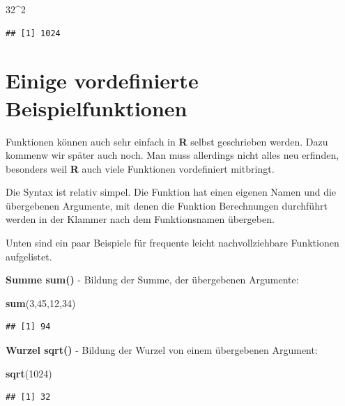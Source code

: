 \documentclass[]{book}
\newenvironment{Shaded}{\begin{snugshade}}{\end{snugshade}}
\newcommand{\KeywordTok}[1]{\textcolor[rgb]{0.13,0.29,0.53}{\textbf{#1}}}
\newcommand{\DecValTok}[1]{\textcolor[rgb]{0.00,0.00,0.81}{#1}}
\newcommand{\OperatorTok}[1]{\textcolor[rgb]{0.81,0.36,0.00}{\textbf{#1}}}
\newcommand{\NormalTok}[1]{#1}
\begin{document}
\begin{Shaded}
\begin{Highlighting}[]
\DecValTok{32}\OperatorTok{^}\DecValTok{2}
\end{Highlighting}
\end{Shaded}

\begin{verbatim}
## [1] 1024
\end{verbatim}

\section{Einige vordefinierte
Beispielfunktionen}\label{einige-vordefinierte-beispielfunktionen}

Funktionen können auch sehr einfach in \textbf{R} selbst geschrieben
werden. Dazu kommenw wir später auch noch. Man muss allerdings nicht
alles neu erfinden, besonders weil \textbf{R} auch viele Funktionen
vordefiniert mitbringt.

Die Syntax ist relativ simpel. Die Funktion hat einen eigenen Namen und
die übergebenen Argumente, mit denen die Funktion Berechnungen
durchführt werden in der Klammer nach dem Funktionsnamen übergeben.

Unten sind ein paar Beispiele für frequente leicht nachvollziehbare
Funktionen aufgelistet.

\textbf{Summe sum()} - Bildung der Summe, der übergebenen Argumente:

\begin{Shaded}
\begin{Highlighting}[]
\KeywordTok{sum}\NormalTok{(}\DecValTok{3}\NormalTok{,}\DecValTok{45}\NormalTok{,}\DecValTok{12}\NormalTok{,}\DecValTok{34}\NormalTok{)}
\end{Highlighting}
\end{Shaded}

\begin{verbatim}
## [1] 94
\end{verbatim}

\textbf{Wurzel sqrt()} - Bildung der Wurzel von einem übergebenen
Argument:

\begin{Shaded}
\begin{Highlighting}[]
\KeywordTok{sqrt}\NormalTok{(}\DecValTok{1024}\NormalTok{)}
\end{Highlighting}
\end{Shaded}

\begin{verbatim}
## [1] 32
\end{verbatim}
\end{document}
